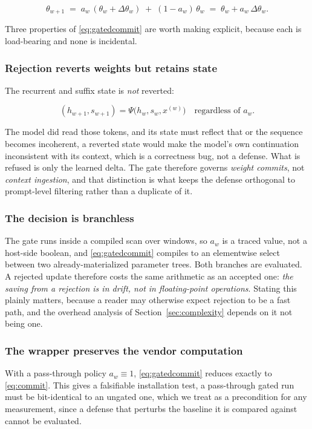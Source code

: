 \documentclass[journal]{IEEEtran}
\newcommand{\fast}{\theta}
\newcommand{\dtheta}{\Delta\theta}
\begin{document}
\begin{equation}
\fast_{w+1} \;=\; a_w\,(\fast_w + \dtheta_w) \;+\; (1-a_w)\,\fast_w
\;=\; \fast_w + a_w\,\dtheta_w .
\label{eq:gatedcommit}
\end{equation}

Three properties of \eqref{eq:gatedcommit} are worth making explicit, because each
is load-bearing and none is incidental.

\subsubsection{Rejection reverts weights but retains state}
The recurrent and suffix state is \emph{not} reverted:

\begin{equation}
(h_{w+1}, s_{w+1}) = \Psi\big(h_w, s_w, x^{(w)}\big)
\quad \text{regardless of } a_w .
\label{eq:stateretained}
\end{equation}

The model did read those tokens, and its state must reflect that or the sequence
becomes incoherent, a reverted state would make the model's own continuation
inconsistent with its context, which is a correctness bug, not a defense. What is
refused is only the learned delta. The gate therefore governs \emph{weight commits},
not \emph{context ingestion}, and that distinction is what keeps the defense
orthogonal to prompt-level filtering rather than a duplicate of it.

\subsubsection{The decision is branchless}
The gate runs inside a compiled scan over windows, so $a_w$ is a traced value, not a
host-side boolean, and \eqref{eq:gatedcommit} compiles to an elementwise select
between two already-materialized parameter trees. Both branches are evaluated. A
rejected update therefore costs the same arithmetic as an accepted one: \emph{the
saving from a rejection is in drift, not in floating-point operations}. Stating this
plainly matters, because a reader may otherwise expect rejection to be a fast path,
and the overhead analysis of Section~\ref{sec:complexity} depends on it not being
one.

\subsubsection{The wrapper preserves the vendor computation}
With a pass-through policy $a_w \equiv 1$, \eqref{eq:gatedcommit} reduces exactly to
\eqref{eq:commit}. This gives a falsifiable installation test, a pass-through
gated run must be bit-identical to an ungated one, which we treat as a
precondition for any measurement, since a defense that perturbs the baseline it is
compared against cannot be evaluated.
\end{document}
